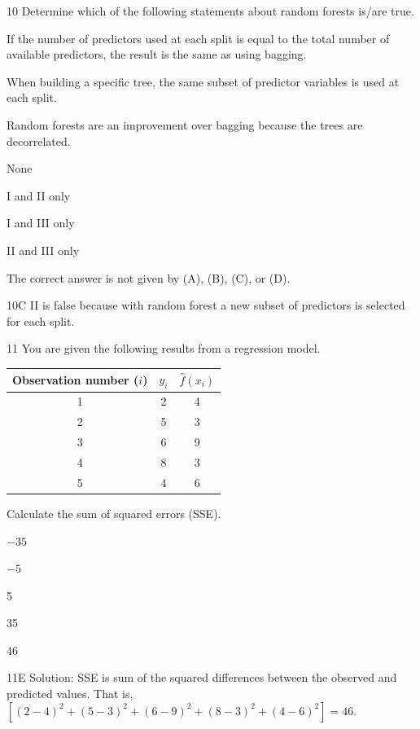 \begin{question}{10}
Determine which of the following statements about random forests is/are true.
\begin{statements}
\item If the number of predictors used at each split is equal to the total number of available predictors, the result is the same as using bagging.
\item When building a specific tree, the same subset of predictor variables is used at each split.
\item Random forests are an improvement over bagging because the trees are decorrelated.
\end{statements}

\begin{choices}
\item None
\item I and II only
\item I and III only
\item II and III only
\item The correct answer is not given by (A), (B), (C), or (D).
\end{choices}
\end{question}
\begin{solution}{10}{C}
II is false because with random forest a new subset of predictors is selected for each split.
\end{solution}

\begin{question}{11}
You are given the following results from a regression model.

\begin{center}
\begin{tabular}{|c|c|c|}
\hline
Observation number ($i$) & $y_i$ & $\hat{f}(x_i)$ \\ \hline
1 & 2 & 4 \\ \hline
2 & 5 & 3 \\ \hline
3 & 6 & 9 \\ \hline
4 & 8 & 3 \\ \hline
5 & 4 & 6 \\ \hline
\end{tabular}
\end{center}

Calculate the sum of squared errors (SSE).

\begin{choices}
\item $-35$
\item $-5$
\item 5
\item 35
\item 46
\end{choices}
\end{question}
\begin{solution}{11}{E}
Solution: SSE is sum of the squared differences between the observed and predicted values. That is, $[(2-4)^2 + (5-3)^2 + (6-9)^2 + (8-3)^2 + (4-6)^2] = 46.$
\end{solution}

